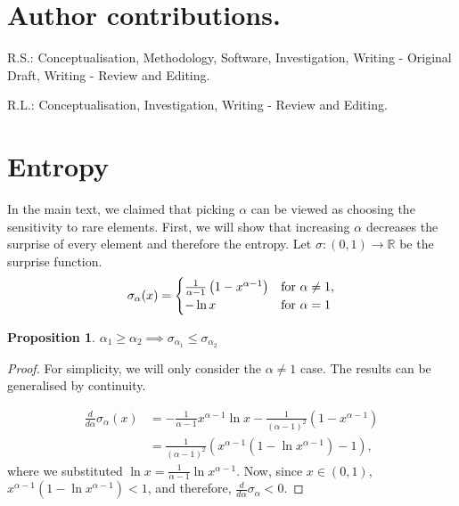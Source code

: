 \documentclass[aps,pre,floats,floatfix,superscriptaddress,twocolumn,final,10pt]{revtex4-2}
\theoremstyle{definition}
\newtheorem{proposition}{Proposition}
\begin{document}
\section*{Author contributions.} 
R.S.: Conceptualisation, Methodology, Software, Investigation, Writing - Original Draft, Writing - Review and Editing.

R.L.: Conceptualisation, Investigation, Writing - Review and Editing.





\onecolumngrid
\appendix
\renewcommand{\thefigure}{S\arabic{figure}}
\renewcommand{\thetable}{S\arabic{table}}
\renewcommand{\theproposition}{S\arabic{proposition}}
\setcounter{figure}{0}
\setcounter{proposition}{0}
\setcounter{table}{0}

\clearpage

\section{Entropy}
In the main text, we claimed that picking $\alpha$ can be viewed as choosing the sensitivity to rare elements. First, we will show that increasing $\alpha$ decreases the surprise of every element and therefore the entropy. Let $\sigma:(0,1) \to\mathbb{R}$ be the surprise function.
\begin{equation}
    \sigma_\alpha(x) = \begin{cases}
        \frac{1}{\alpha - 1} \left( 1 - x^{\alpha-1} \right) & \textnormal{for } \alpha \neq 1,\\
        - \ln x & \textnormal{for } \alpha=1
    \end{cases}
\end{equation}

\begin{proposition}
    $\alpha_1 \geq \alpha_2 \implies \sigma_{\alpha_1} \leq \sigma_{\alpha_2}$
\end{proposition}
\begin{proof}
    For simplicity, we will only consider the $\alpha\neq1$ case. The results can be generalised by continuity.

    \begin{align*}
        \frac{d}{d\alpha} \sigma_\alpha(x) &= -\frac{1}{\alpha-1} x^{\alpha-1}\ln x - \frac{1}{(\alpha-1)^2}\left( 1 - x^{\alpha-1} \right)\\
        &= \frac{1}{(\alpha-1)^2} \left( x^{\alpha-1} \left( 1 - \ln x^{\alpha-1} \right) - 1 \right),
    \end{align*}
    where we substituted $\ln x = \frac{1}{\alpha-1} \ln x^{\alpha-1}$. Now, since $x\in(0,1)$, $x^{\alpha-1} \left( 1 - \ln x^{\alpha-1} \right) < 1$, and therefore, $\frac{d}{d\alpha} \sigma_\alpha<0$.
\end{proof}
\end{document}
